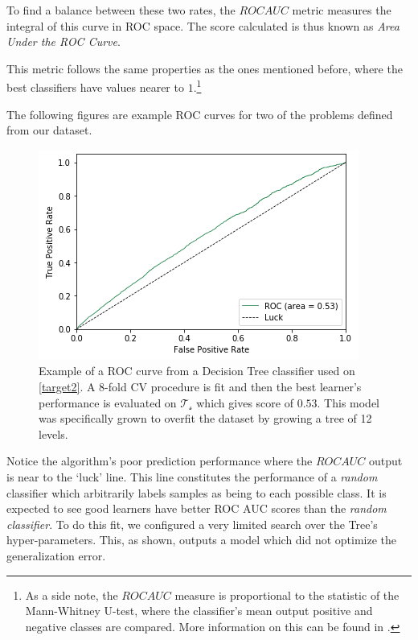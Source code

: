 To find a balance between these two rates, the $ROC AUC$ metric measures the integral of this curve in ROC space.
The score calculated is thus known as \textit{Area Under the ROC Curve}.

This metric follows the same properties as the ones mentioned before, where the best classifiers have values nearer to $1$.\footnote{As a side note, the $ROC AUC$ measure is proportional to the statistic of the Mann-Whitney U-test, where the classifier's mean output positive and negative classes are compared.
More information on this can be found in \citep{mason-rocAucRelationship}.}

The following figures are example ROC curves for two of the problems defined from our dataset.


\begin{figure}[h!]
\begin{center}
\includegraphics[width=1\columnwidth]{figures/figure-lowROCAUC/figure-lowROCAUC_original}
\caption{Example of a ROC curve from a Decision Tree classifier used on \cref{target2}. A 8-fold CV procedure is fit and then the best learner's performance is evaluated on $\mathcal{T_s}$ which gives score of $0.53$. This model was specifically grown to overfit the dataset by growing a tree of 12 levels.}
\label{fg:lowROCAUC}
\end{center}
\end{figure}

Notice the algorithm's poor prediction performance where the $ROC AUC$ output is near to the `luck' line.
This line constitutes the performance of a \textit{random} classifier which arbitrarily labels samples as being to each possible class.
It is expected to see good learners have better ROC AUC scores than the \textit{random classifier}.
To do this fit, we configured a very limited search over the Tree's hyper-parameters.
This, as shown, outputs a model which did not optimize the generalization error.



